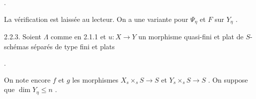\begin{center}
\quad .
\end{center}


La vérification est laissée au lecteur. On a une variante pour $\Psi_\eta$ et $F$ sur $Y_\eta$ .

2.2.3. Soient $\Lambda$ comme en 2.1.1 et $u : X \to Y$ un morphisme quasi-fini et plat de $S$-schémas séparés de type fini et plats

\begin{center}
\quad .
\end{center}
On note encore $f$ et $g$ les morphismes $X_s \times_s S \to S$ et $Y_s \times_s S \to S$ . On suppose que $\dim Y_\eta \leq n$ .

